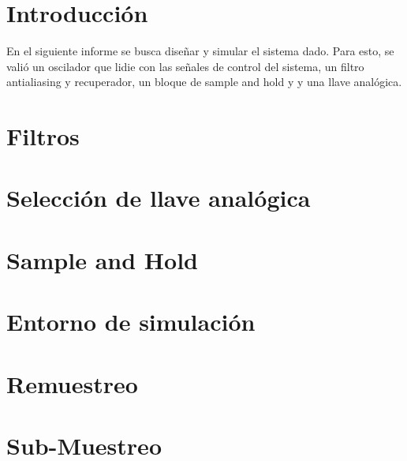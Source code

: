 







\tableofcontents
\newpage


\section{Introducción}

En el siguiente informe se busca diseñar y simular el sistema dado. Para esto, se valió un oscilador que lidie con las señales de control del sistema, un filtro antialiasing y recuperador, un bloque de sample and hold y y una llave analógica.

\section{Filtros}
	\label{Ejercicio-2}
	

\pagebreak
\section{Selección de llave analógica}
	\label{Ejercicio-3}
	

\pagebreak	
\section{Sample and Hold}
	\label{Ejercicio-4}
	
	


\pagebreak

\section{Entorno de simulación}
	\label{Ejercicio-5}
	
	
\pagebreak

%	
%	

\section{Remuestreo}
	\label{Ejercicio-7}
	
	
\pagebreak	
\section{Sub-Muestreo}
	\label{Ejercicio-8}
	
	
